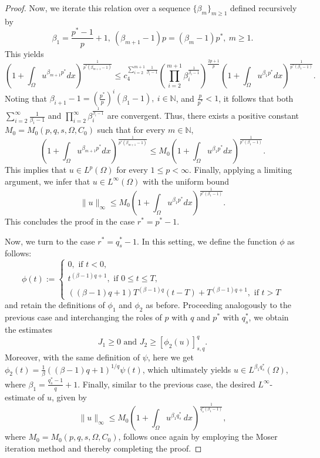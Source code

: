 \documentclass[reqno,oneside]{amsart}
\theoremstyle{definition}
\theoremstyle{remark}
\numberwithin{equation}{section}
\newcommand{\Om} {\Omega}
\newcommand{\ba}{\beta}
\newcommand{\sn}{\mathbb{N}}
\begin{document}
\begin{proof}
    Now, we iterate this relation over a sequence $\{\beta_m\}_{m\geq 1}$ defined recursively by
    \[\ba_1 = \frac{p^* -1}{p}+1,\ (\beta_{m+1} -1)p = (\beta_m -1) p^*,\ m\geq 1.\]
    This yields
    \begin{equation}
        \left( 1+ \int_{\Om} u^{\beta_{m+1} p^*} dx \right)^{\frac{1}{p^* (\beta_{m+1} -1)}} \leq c_4^{\sum_{i=2}^{m+1} \frac{1}{\beta_i -1}} \left( \prod_{i=2}^{m+1} \beta_i^{\frac{1}{\beta_i -1}} \right)^{\frac{2p+1}{p}} \left( 1+ \int_{\Om} u^{\beta_1 p^*} dx \right)^{\frac{1}{p^* (\beta_1 -1)}}.
    \end{equation}
    Noting that $\beta_{i+1} -1 = \left(\frac{p^*}{p}\right)^i (\beta_1 -1),\ i\in \sn$, and $\frac{p}{p^*}<1$, it follows that both $\sum_{i=2}^{\infty} \frac{1}{\beta_i -1}$ and $\prod_{i=2}^{\infty} \beta_i^{\frac{1}{\beta_i -1}}$ are convergent. Thus, there exists a positive constant $M_0 = M_0 \left(p, q,s,\Om,C_0 \right)$ such that for every $m\in\sn$,
    \[\left( 1+ \int_{\Om} u^{\beta_{m+1} p^*} dx \right)^{\frac{1}{p^* \left(\beta_{m+1} -1 \right)}} \leq M_0 \left( 1+ \int_{\Om} u^{\beta_1 p^*} dx \right)^{\frac{1}{p^* \left(\beta_1 -1 \right)}}.\]
    This implies that $u\in L^p (\Om)$ for every $1\leq p < \infty$. Finally, applying a limiting argument, we infer that $u\in L^{\infty}(\Om)$ with the uniform bound
    \[ \|u\|_{\infty} \leq M_0 \left( 1+ \int_{\Om} u^{\beta_1 p^*} dx \right)^{\frac{1}{p^* (\beta_1 -1)}}.\]
    This concludes the proof in the case $r^* = p^* -1$.

    Now, we turn to the case $r^* = q_s^* -1$. In this setting, we define the function $\phi$ as follows:
    \[\phi(t) := \begin{cases}
        0, \text{ if } t < 0,\\[1mm]
        t^{(\ba -1)q+1}, \text{ if } 0 \leq t \leq T,\\[1mm]
        \left( (\ba-1)q+1 \right) T^{(\ba -1)q} (t-T) +T^{(\ba-1)q+1}, \text{ if } t > T
    \end{cases}\]
    and retain the definitions of $\phi_1$ and $\phi_2$ as before. Proceeding analogously to the previous case and interchanging the roles of $p$ with $q$ and $p^*$ with $q_s^*$, we obtain the estimates
    \[J_1 \geq 0 \text{ and } J_2 \geq [\phi_2 (u)]_{s,q}^q.\]
    Moreover, with the same definition of $\psi$, here we get $\phi_2 (t) = \frac{1}{\beta} \left((\beta -1)q +1 \right)^{1/q} \psi (t)$, which ultimately yields $u\in L^{\beta_1 q_s^*}(\Om)$, where $\beta_1 = \frac{q_s^* -1}{q}+1$. Finally, similar to the previous case, the desired $L^{\infty}$-estimate of $u$, given by
    \[ \|u\|_{\infty} \leq M_0 \left( 1+ \int_{\Om} u^{\beta_1 q_s^*}\ dx \right)^{\frac{1}{q_s^* (\beta_1 -1)}},\]
    where $M_0 = M_0(p, q,s,\Om,C_0)$, follows once again by employing the Moser iteration method and thereby completing the proof.
\end{proof}



	
\end{document}

